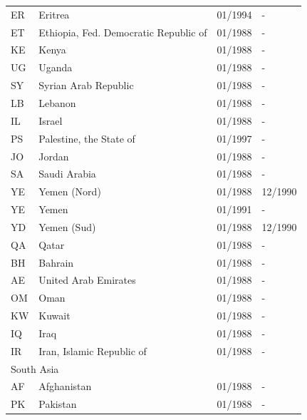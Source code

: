 \begin{footnotesize}
\begin{longtable}{p{0.5cm}p{9cm}p{2cm}p{2cm}}
ER	&	Eritrea	&	01/1994	&	-	\\

ET	&	Ethiopia, Fed. Democratic Republic of	&	01/1988	&	-	\\

KE	&	Kenya	&	01/1988	&	-	\\

UG	&	Uganda	&	01/1988	&	-	\\

SY	&	Syrian Arab Republic	&	01/1988	&	-	\\

LB	&	Lebanon	&	01/1988	&	-	\\

IL	&	Israel	&	01/1988	&	-	\\

PS	&	Palestine, the State of	&	01/1997	&	-	\\

JO	&	Jordan	&	01/1988	&	-	\\

SA	&	Saudi Arabia	&	01/1988	&	-	\\

YE	&	Yemen (Nord)	&	01/1988	&	12/1990	\\

YE	&	Yemen	&	01/1991	&	-	\\

YD	&	Yemen (Sud)	&	01/1988	&	12/1990	\\

QA	&	Qatar	&	01/1988	&	-	\\

BH	&	Bahrain	&	01/1988	&	-	\\

AE	&	United Arab Emirates	&	01/1988	&	-	\\

OM	&	Oman	&	01/1988	&	-	\\

KW	&	Kuwait	&	01/1988	&	-	\\

IQ	&	Iraq	&	01/1988	&	-	\\

IR	&	Iran, Islamic Republic of	&	01/1988	&	-	\\

\midrule
\multicolumn{3}{l}{South Asia}	&	\\
AF	&	Afghanistan	&	01/1988	&	-	\\

PK	&	Pakistan	&	01/1988	&	-	\\


\end{longtable}
\end{footnotesize}
